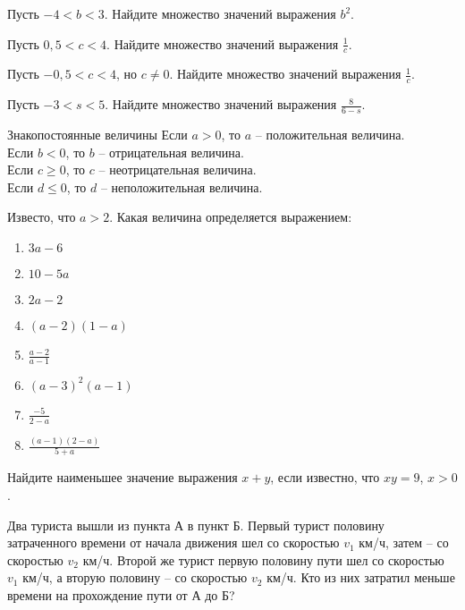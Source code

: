 \documentclass[algebra,twocolumn]{pum}
\begin{document}
  \begin{question}
    Пусть $-4<b<3$. Найдите множество значений выражения $b^2$.
  \end{question}
  \begin{question}
    Пусть $0,5<c<4$. Найдите множество значений выражения $\frac{1}{c}$.
  \end{question}
  \begin{question}
    Пусть $-0,5<c<4$, но $c\ne0$. Найдите множество значений выражения $\frac{1}{c}$.
  \end{question}
  \begin{question}
    Пусть $-3<s<5$. Найдите множество значений выражения $\frac{8}{6-s}$.
  \end{question}

  \begin{pumbox}{Знакопостоянные величины}
    Если $a>0$, то $a$ -- положительная величина. \\
    Если $b<0$, то $b$ -- отрицательная величина.\\ 
    Если $c\ge0$, то $c$ -- неотрицательная величина.\\
    Если $d\le0$, то $d$ -- неположительная величина.
  \end{pumbox}

  \begin{question}
    Известо, что $a>2$. Какая величина определяется выражением:
    \begin{multicols}{2}
      \begin{enumerate}
        \item $3a-6$
        \item $10-5a$
        \item $2a-2$
        \item $(a-2)(1-a)$
        \item $\frac{a-2}{a-1}$
        \item $(a-3)^2(a-1)$
        \item $\frac{-5}{2-a}$
        \item $\frac{(a-1)(2-a)}{5+a}$
      \end{enumerate}
    \end{multicols}
  \end{question}

  \begin{question}
    Найдите наименьшее значение выражения $x+y$, если известно, что $xy=9$, $x>0$.
  \end{question}

  \begin{question}
    Два туриста вышли из пункта А в пункт Б. Первый турист половину затраченного времени от начала движения шел со скоростью $v_1$ км/ч, затем -- со скоростью $v_2$ км/ч. Второй же турист первую половину пути шел со скоростью $v_1$ км/ч, а вторую половину -- со скоростью $v_2$ км/ч. Кто из них затратил меньше времени на прохождение пути от А до Б?
  \end{question}
\end{document}
